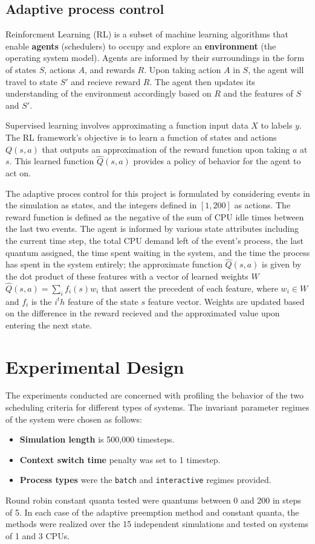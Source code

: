 \documentclass{article}
\begin{document}
\subsection*{Adaptive process control}
Reinforcment Learning (RL) is a subset of machine learning algorithms that enable \textbf{agents} (schedulers) to occupy
and explore an \textbf{environment} (the operating system model). 
Agents are informed by their surroundings in the form of states $S$, actions $A$, and rewards $R$.
Upon taking action $A$ in $S$, the agent will travel to state $S'$ and recieve reward $R$.
The agent then updates its understanding of the environment accordingly based on $R$ and the
features of $S$ and $S'$.
\par
Supervised learning involves approximating a function input data $X$ to labels $y$. 
The RL framework's objective is to learn a function of states and actions $Q(s,a)$ that outputs an
approximation of the reward function upon taking $a$ at $s$. This learned function $\hat{Q}(s,a)$
provides a policy of behavior for the agent to act on.
\par
The adaptive proces control for this project is formulated by considering events in the simulation
as states, and the integers defined in $[1,200]$ as actions. The reward function is defined as the  
negative of the sum of CPU idle times between the last two events. The agent is informed by
various state attributes including the current time step, the total CPU demand left of the event's
process, the last quantum assigned, the time spent waiting in the system, and the time the 
process has spent in the system entirely; the approximate function $\hat{Q}(s,a)$ is given by the 
dot product of these features with a vector of learned weights $W$ $\hat{Q}(s,a)=\sum_{i}f_i(s)w_i$ that assert the precedent
of each feature, where $w_i \in W$ and $f_i$ is the $i^th$ feature of the state $s$ feature vector. 
Weights are updated based on the difference in the reward recieved and the approximated value upon entering the next state. 
\section*{Experimental Design}
The experiments conducted are concerned with profiling the behavior of the two scheduling criteria
for different types of systems. The invariant parameter regimes of the system were chosen as follows:
\begin{itemize}
    \item \textbf{Simulation length} is 500,000 timesteps.
    \item \textbf{Context switch time} penalty was set to 1 timestep.
    \item \textbf{Process types} were the \texttt{batch} and \texttt{interactive} regimes provided.
\end{itemize}
Round robin constant quanta tested were quantums between 0 and 200 in steps of 5. In each case
of the adaptive preemption method and constant quanta, the methods were realized over the
15 independent simulations and tested on systems of 1 and 3 CPUs. 
\end{document}
